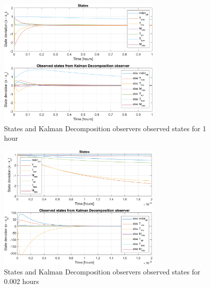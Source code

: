 \begin{figure}[h!]
	\centering
	\includegraphics[width=0.7\textwidth]{Graphics/fig_stateObsState1h.png}
	\caption{States and Kalman Decomposition observers observed states for 1 hour}
	\label{fig:sim_stateObsState1h}
\end{figure}

\begin{figure}[h!]
	\centering
	\includegraphics[width=0.7\textwidth]{Graphics/fig_stateObsState002h.png}
	\caption{States and Kalman Decomposition observers observed states for 0.002 hours}
	\label{fig:sim_stateObsState002h}
\end{figure}
